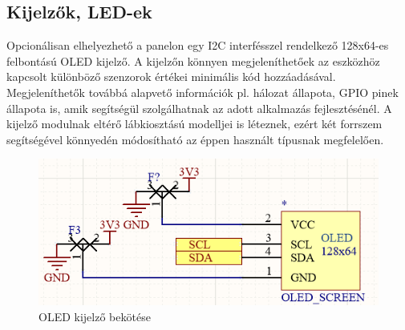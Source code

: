 \subsection{Kijelzők, LED-ek}
Opcionálisan elhelyezhető a panelon egy I2C interfésszel rendelkező 128x64-es felbontású OLED kijelző. A kijelzőn könnyen megjeleníthetőek az eszközhöz kapcsolt különböző szenzorok értékei minimális kód hozzáadásával. Megjeleníthetők továbbá alapvető információk pl. hálozat állapota, GPIO pinek állapota is, amik segítségül szolgálhatnak az adott alkalmazás fejlesztésénél. A kijelző modulnak eltérő lábkiosztású modelljei is léteznek, ezért két forrszem segítségével könnyedén módosítható az éppen használt típusnak megfelelően.
\begin{figure}[!ht]
    \centering
    \includegraphics[width=120mm, keepaspectratio]{figures/display.png}
    \caption{OLED kijelző bekötése}
    \label{fig:oled}
\end{figure}

